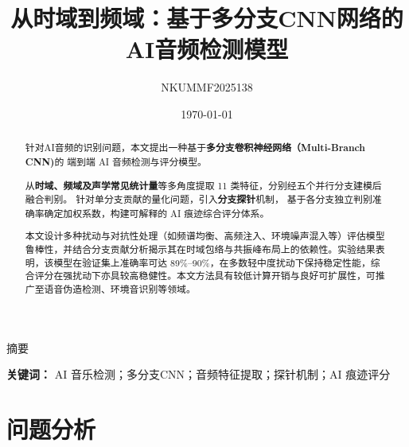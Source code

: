 \documentclass[aspectratio=169]{beamer}
\title{从时域到频域：基于多分支CNN网络的AI音频检测模型}
\author{NKUMMF2025138}
\date{\today}
\begin{document}
\begin{frame}
  \titlepage
\end{frame}


\begin{frame}{摘要}
\small

\vspace{1cm}

\begin{abstract}
针对AI音频的识别问题，本文提出一种基于\textbf{多分支卷积神经网络（Multi-Branch CNN)}的
端到端 AI 音频检测与评分模型。

从\textbf{时域、频域及声学常见统计量}等多角度提取 11 类特征，分别经五个并行分支建模后融合判别。
针对单分支贡献的量化问题，引入\textbf{分支探针}机制，
基于各分支独立判别准确率确定加权系数，构建可解释的 AI 痕迹综合评分体系。

本文设计多种扰动与对抗性处理（如频谱均衡、高频注入、环境噪声混入等）评估模型鲁棒性，并结合分支贡献分析揭示其在时域包络与共振峰布局上的依赖性。实验结果表明，该模型在验证集上准确率可达 89\%–90\%，在多数轻中度扰动下保持稳定性能，综合评分在强扰动下亦具较高稳健性。本文方法具有较低计算开销与良好可扩展性，可推广至语音伪造检测、环境音识别等领域。
\end{abstract}

\vspace{0.5em}
\noindent\textbf{关键词：} AI 音乐检测；多分支CNN；音频特征提取；探针机制；AI 痕迹评分

\end{frame}



\section{问题分析}
\end{document}
